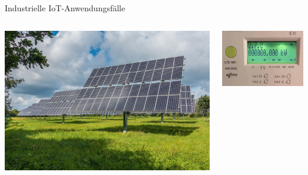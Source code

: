 \begin{frame}{Industrielle IoT-Anwendungsfälle}
    \begin{columns}
        \begin{column}[b]{.45\textwidth}
            \begin{center}
                \includegraphics[width=\textwidth]{img/iiot-energie}
            \end{center}
        \end{column}
        \begin{column}[b]{.45\textwidth}
            \begin{center}
                \includegraphics[width=\textwidth]{img/iiot-smartmeter}
            \end{center}
        \end{column}
    \end{columns}
\end{frame}

